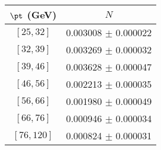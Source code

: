 \begin{tabular}{c||c}
$\pt$ (GeV) & $N$  \\
\hline
$[25, 32]$ & 0.003008 $\pm$ 0.000022\\
$[32, 39]$ & 0.003269 $\pm$ 0.000032\\
$[39, 46]$ & 0.003628 $\pm$ 0.000047\\
$[46, 56]$ & 0.002213 $\pm$ 0.000035\\
$[56, 66]$ & 0.001980 $\pm$ 0.000049\\
$[66, 76]$ & 0.000946 $\pm$ 0.000034\\
$[76, 120]$ & 0.000824 $\pm$ 0.000031\\
\end{tabular}
